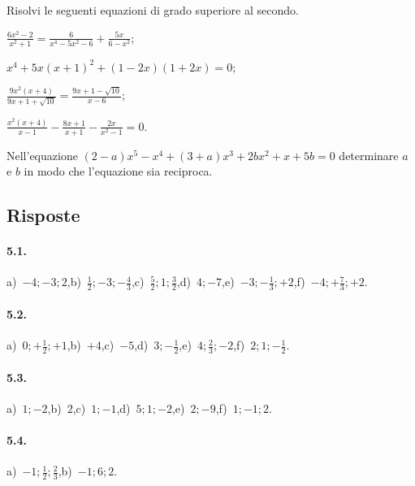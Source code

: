 \begin{esercizio}[\Ast] %
Risolvi le seguenti equazioni di grado superiore al secondo.
\begin{multicols}{2}
\begin{enumeratea}
\item $\frac{6x^2-2}{x^2+1}=\frac 6{x^4-5x^2-6}+\frac{5x}{6-x^2}$;
\item $x^4+5x(x+1)^2+(1-2x)(1+2x)=0$;
\item $\frac{9x^2(x+4)}{9x+1+\sqrt{10}}=\frac{9x+1-\sqrt{10}}{x-6}$;
\item $\frac{x^2(x+4)}{x-1}-\frac{8x+1}{x+1}-\frac{2x}{x^2-1}=0$.
\end{enumeratea}
\end{multicols}
\end{esercizio}

\begin{esercizio}[\Ast] %
Nell'equazione $(2-a)x^5-x^4+(3+a)x^3+2bx^2+x+5b=0$ determinare $a$ e $b$ in modo che l'equazione sia reciproca.
\end{esercizio}

\subsection{Risposte}
\paragraph{5.1.} a)~$-4;-3;2$,\quad b)~$\frac 1 2;-3;-\frac 4 3$,\quad c)~$\frac 5 2;1;\frac 3 2$,\quad d)~$4;-7$,\quad e)~$-3;-\frac 1 3;+2$,\quad f)~$-4;+\frac 7 3;+2$.

\paragraph{5.2.} a)~$0;+\frac 1 2;+1$,\quad b)~$+4$,\quad c)~$-5$,\quad d)~$3;-\frac 1 2$,\quad e)~$4;\frac 2 3;-2$,\quad f)~$2;1;-\frac 1 2$.

\paragraph{5.3.} a)~$1;-2$,\quad b)~$2$,\quad c)~$1;-1$,\quad d)~$5;1;-2$,\quad e)~$2;-9$,\quad f)~$1;-1;2$.

\paragraph{5.4.} a)~$-1;\frac 1 2;\frac 2 3$,\quad b)~$-1;6;2$.

